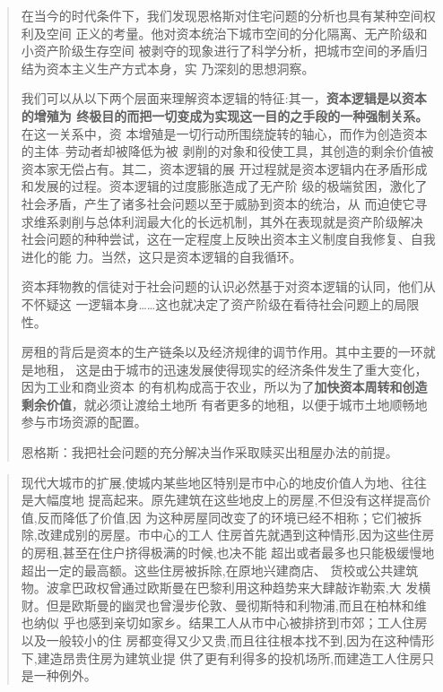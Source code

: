 \begin{quotation}
  在当今的时代条件下，我们发现恩格斯对住宅问题的分析也具有某种空间权利及空间
  正义的考量。他对资本统治下城市空间的分化隔离、无产阶级和小资产阶级生存空间
  被剥夺的现象进行了科学分析，把城市空间的矛盾归结为资本主义生产方式本身，实
  乃深刻的思想洞察。

  我们可以从以下两个层面来理解资本逻辑的特征:其一，\textbf{资本逻辑是以资本的增殖为
    终极目的而把一切变成为实现这一目的之手段的一种强制关系。}在这一关系中，资
  本增殖是一切行动所围绕旋转的轴心，而作为创造资本的主体--劳动者却被降低为被
  剥削的对象和役使工具，其创造的剩余价值被资本家无偿占有。其二，资本逻辑的展
  开过程就是资本逻辑内在矛盾形成和发展的过程。资本逻辑的过度膨胀造成了无产阶
  级的极端贫困，激化了社会矛盾，产生了诸多社会问题以至于威胁到资本的统治，从
  而迫使它寻求维系剥削与总体利润最大化的长远机制，其外在表现就是资产阶级解决
  社会问题的种种尝试，这在一定程度上反映出资本主义制度自我修复、自我进化的能
  力。当然，这只是资本逻辑的自我循环。

  资本拜物教的信徒对于社会问题的认识必然基于对资本逻辑的认同，他们从不怀疑这
  一逻辑本身……这也就决定了资产阶级在看待社会问题上的局限
  性。

  房租的背后是资本的生产链条以及经济规律的调节作用。其中主要的一环就是地租，
  这是由于城市的迅速发展使得现实的经济条件发生了重大变化，因为工业和商业资本
  的有机构成高于农业，所以为了\textbf{加快资本周转和创造剩余价值}，就必须让渡给土地所
  有者更多的地租，以便于城市土地顺畅地参与市场资源的配置。

  恩格斯：我把社会问题的充分解决当作采取赎买出租屋办法的前提。
\end{quotation}

\begin{quotation}
  现代大城市的扩展,使城内某些地区特别是市中心的地皮价值人为地、往往是大幅度地
  提高起来。原先建筑在这些地皮上的房屋,不但没有这样提高价值,反而降低了价值,因
  为这种房屋同改变了的环境已经不相称；它们被拆除,改建成别的房屋。市中心的工人
  住房首先就遇到这种情形,因为这些住房的房租,甚至在住户挤得极满的时候,也决不能
  超出或者最多也只能极缓慢地超出一定的最高额。这些住房被拆除,在原地兴建商店、
  货校或公共建筑物。波拿巴政权曾通过欧斯曼在巴黎利用这种趋势来大肆敲诈勒索,大
  发横财。但是欧斯曼的幽灵也曾漫步伦敦、曼彻斯特和利物浦,而且在柏林和维也纳似
  乎也感到亲切如家乡。结果工人从市中心被排挤到市郊；工人住房以及一般较小的住
  房都变得又少又贵,而且往往根本找不到,因为在这种情形下,建造昂贵住房为建筑业提
  供了更有利得多的投机场所,而建造工人住房只是一种例外。
\end{quotation}

